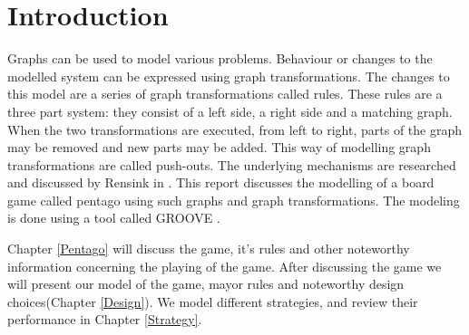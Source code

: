 \section{Introduction}
\label{Introduction}
Graphs can be used to model various problems.
Behaviour or changes to the modelled system can be expressed using graph transformations.
The changes to this model are a series of graph transformations called rules.
These rules are a three part system: they consist of a left side, a right side and a matching graph.
When the two transformations are executed, from left to right, parts of the graph may be removed and new parts may be added.
This way of modelling graph transformations are called push-outs.
The underlying mechanisms are researched and discussed by Rensink in \cite{Rensink2006}.
This report discusses the modelling of a board game called pentago using such graphs and graph transformations. 
The modeling is done using a tool called GROOVE \cite{tool-groove}.

\vspace{6pt}

Chapter \ref{Pentago} will discuss the game, it's rules and other noteworthy information concerning the playing of the game. 
After discussing the game we will present our model of the game, mayor rules and noteworthy design choices(Chapter \ref{Design}).
We model different strategies, and review their performance in Chapter \ref{Strategy}.